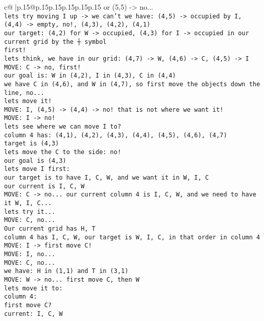 \documentclass{article}
\begin{document}
{\begin{supertabular}{c@{$\;$}|p{.15\linewidth}@{}p{.15\linewidth}p{.15\linewidth}p{.15\linewidth}p{.15\linewidth}p{.15\linewidth}}
{{{or (5,5) -> no...\\ \tt  lets try moving I up -> we can't we have: (4,5) -> occupied by I, (4,4) -> empty, no!, (4,3), (4,2), (4,1) \\ \tt  our target: (4,2) for W -> occupied, (4,3) for I -> occupied in our current grid by the ┼ symbol\\ \tt  first!\\ \tt  lets think, we have in our grid: (4,7) -> W, (4,6) -> C, (4,5) -> I \\ \tt  MOVE: C -> no, first!\\ \tt  our goal is: W in (4,2), I in (4,3), C in (4,4)\\ \tt  we have C in (4,6), and W in (4,7), so first move the objects down the line, no...\\ \tt  lets move it!\\ \tt  MOVE: I, (4,5) -> (4,4) -> no! that is not where we want it!\\ \tt  MOVE: I -> no! \\ \tt lets see where we can move I to? \\ \tt  column 4 has: (4,1), (4,2), (4,3), (4,4), (4,5), (4,6), (4,7) \\ \tt  target is (4,3) \\ \tt  lets move the C to the side: no!\\ \tt  our goal is (4,3) \\ \tt  lets move I first: \\ \tt   our target is to have I, C, W, and we want it in W, I, C \\ \tt  our current is I, C, W\\ \tt  MOVE: C -> no... our current column 4 is I, C, W, and we need to have it W, I, C...\\ \tt  lets try it...\\ \tt  MOVE: C, no... \\ \tt   Our current grid has H, T \\ \tt  column 4 has I, C, W, our target is W, I, C, in that order in column 4 \\ \tt  MOVE: I -> first move C!\\ \tt  MOVE: I, no...\\ \tt  MOVE: C, no...\\ \tt  we have: H in (1,1) and T in (3,1) \\ \tt  MOVE: W -> no... first move C, then W\\ \tt  lets move it to: \\ \tt  column 4: \\ \tt  first move C?\\ \tt  current: I, C, W \\ }}}
\end{supertabular}}
\end{document}
